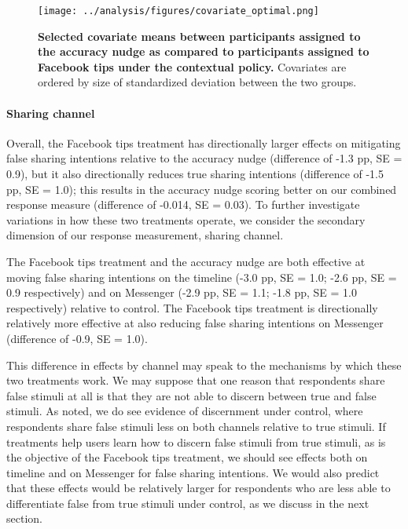 \documentclass[letterpaper, 12pt, parskip=full,DIV=10]{scrartcl}
\begin{document}

\begin{figure}[H] %
   \centering
   \texttt{[image: ../analysis/figures/covariate\_optimal.png]} 
   \caption{\textbf{Selected covariate means between participants assigned to the accuracy nudge as compared to participants assigned to Facebook tips under the contextual policy.} Covariates are ordered by size of standardized deviation between the two groups. }
   \label{fig:heterogeneity_covariates}
\end{figure}


\paragraph{Sharing channel}
Overall, the Facebook tips treatment has directionally larger effects on mitigating false sharing intentions relative to the accuracy nudge (difference of -1.3 pp, SE = 0.9), but it also directionally reduces true sharing intentions (difference of -1.5 pp, SE = 1.0); this results in the accuracy nudge scoring better on our combined response measure (difference of -0.014, SE = 0.03). To further investigate variations in how these two treatments operate, we consider the secondary dimension of our response measurement, sharing channel. 

The Facebook tips treatment and the accuracy nudge are both effective at moving false sharing intentions on the timeline (-3.0 pp, SE = 1.0; -2.6 pp, SE = 0.9 respectively)  and on Messenger (-2.9 pp, SE = 1.1; -1.8 pp, SE = 1.0 respectively)  relative to control. %
The Facebook tips treatment is directionally relatively more effective at also reducing false sharing intentions on Messenger (difference of -0.9, SE = 1.0). 

This difference in effects by channel may speak to the mechanisms by which these two treatments work. We may suppose that one reason that respondents share false stimuli at all is that they are not able to discern between true and false stimuli. As noted, we do see evidence of discernment under control, where respondents share false stimuli less on both channels relative to true stimuli. If treatments help users learn how to discern false stimuli from true stimuli, as is the objective of the Facebook tips treatment, we should see effects both on timeline and on Messenger for false sharing intentions. We would also predict that these effects would be relatively larger for respondents who are less able to differentiate false from true stimuli under control, as we discuss in the next section. 
\end{document}

